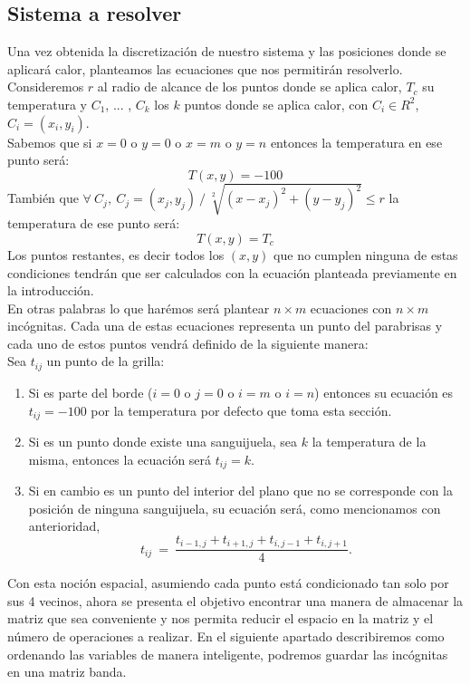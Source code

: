 \subsection{Sistema a resolver}

Una vez obtenida la discretización de nuestro sistema y las posiciones donde se aplicará calor, planteamos las ecuaciones que nos permitirán resolverlo. Consideremos $r$ al radio de alcance de los puntos donde se aplica calor, $T_c$ su temperatura y $C_1$, ... , $C_k$ los $k$ puntos donde se aplica calor, con $C_i \in R^2$, $C_i = (x_i, y_i)$.
\\
Sabemos que si $ x = 0$ o $y = 0$ o $x = m$ o $y = n$ entonces la temperatura en ese punto será:
$$T(x,y) = -100$$
También que $\forall \: C_j, \: C_j = (x_j, y_j) \: / \: \sqrt[2]{(x-x_j)^2 + (y-y_j)^2} \le r$ la temperatura de ese punto será:
$$T(x,y) = T_c$$ 
Los puntos restantes, es decir todos los $(x,y)$ que no cumplen ninguna de estas condiciones tendrán que ser calculados con la ecuación planteada previamente en la introducción.
\\
En otras palabras lo que harémos será plantear $n \times m$ ecuaciones con $n \times m$ incógnitas. Cada una de estas ecuaciones representa un punto del parabrisas y cada uno de estos puntos vendrá definido de la siguiente manera:
\\
Sea $t_{ij}$ un punto de la grilla:
\begin{enumerate}
 \item Si es parte del borde ($ i = 0$ o $j = 0$ o $i = m$ o $i = n$) entonces su ecuación es $t_{ij} = -100$ por la temperatura por defecto que toma esta sección.
 \item Si es un punto donde existe una sanguijuela, sea $k$ la temperatura de la misma, entonces la ecuación será $t_{ij} = k$.
 \item Si en cambio es un punto del interior del plano que no se corresponde con la posición de ninguna sanguijuela, su ecuación será, como mencionamos con anterioridad, 
\begin{equation}
t_{ij} \ =\ \frac{ t_{i-1,j} + t_{i+1,j} + t_{i,j-1} + t_{i,j+1}}{4}.
\end{equation}
\end{enumerate}

Con esta noción espacial, asumiendo cada punto está condicionado tan solo por sus 4 vecinos, ahora se presenta el objetivo encontrar una manera de almacenar la matriz que sea conveniente y nos permita reducir el espacio en la matriz y el número de operaciones a realizar. En el siguiente apartado describiremos como ordenando las variables de manera inteligente, podremos guardar las incógnitas en una matriz banda.

